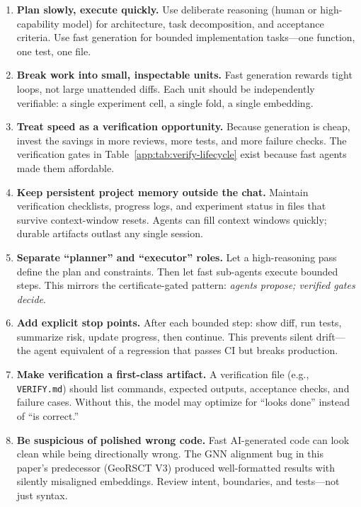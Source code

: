 \begin{enumerate}

\item \textbf{Plan slowly, execute quickly.} Use deliberate reasoning
  (human or high-capability model) for architecture, task decomposition,
  and acceptance criteria. Use fast generation for bounded implementation
  tasks---one function, one test, one file.

\item \textbf{Break work into small, inspectable units.} Fast generation
  rewards tight loops, not large unattended diffs. Each unit should be
  independently verifiable: a single experiment cell, a single fold, a
  single embedding.

\item \textbf{Treat speed as a verification opportunity.} Because
  generation is cheap, invest the savings in more reviews, more tests,
  and more failure checks. The verification gates in
  Table~\ref{app:tab:verify-lifecycle} exist because fast agents made
  them affordable.

\item \textbf{Keep persistent project memory outside the chat.} Maintain
  verification checklists, progress logs, and experiment status in files
  that survive context-window resets. Agents can fill context windows
  quickly; durable artifacts outlast any single session.

\item \textbf{Separate ``planner'' and ``executor'' roles.} Let a
  high-reasoning pass define the plan and constraints. Then let fast
  sub-agents execute bounded steps. This mirrors the certificate-gated
  pattern: \emph{agents propose; verified gates decide}.

\item \textbf{Add explicit stop points.} After each bounded step: show
  diff, run tests, summarize risk, update progress, then continue. This
  prevents silent drift---the agent equivalent of a regression that
  passes CI but breaks production.

\item \textbf{Make verification a first-class artifact.} A verification
  file (e.g., \texttt{VERIFY.md}) should list commands, expected outputs,
  acceptance checks, and failure cases. Without this, the model may
  optimize for ``looks done'' instead of ``is correct.''

\item \textbf{Be suspicious of polished wrong code.} Fast AI-generated
  code can look clean while being directionally wrong. The GNN alignment
  bug in this paper's predecessor (GeoRSCT V3) produced well-formatted
  results with silently misaligned embeddings. Review intent, boundaries,
  and tests---not just syntax.


\end{enumerate}
